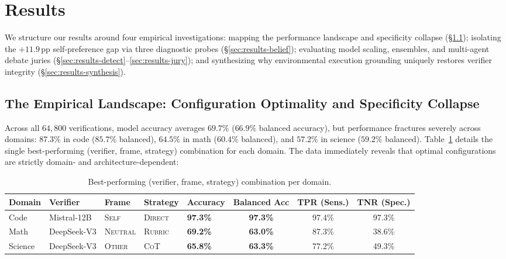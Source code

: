 \section{Results}
\label{sec:results}

We structure our results around four empirical investigations: mapping the performance landscape and specificity collapse (\S\ref{sec:results-landscape}); isolating the $+11.9$\,pp self-preference gap via three diagnostic probes (\S\ref{sec:results-belief}); evaluating model scaling, ensembles, and multi-agent debate juries (\S\ref{sec:results-detect}--\ref{sec:results-jury}); and synthesizing why environmental execution grounding uniquely restores verifier integrity (\S\ref{sec:results-synthesis}).

\subsection{The Empirical Landscape: Configuration Optimality and Specificity Collapse}
\label{sec:results-landscape}

Across all $64{,}800$ verifications, model accuracy averages $69.7\%$ ($66.9\%$ balanced accuracy), but performance fractures severely across domains: $87.3\%$ in code ($85.7\%$ balanced), $64.5\%$ in math ($60.4\%$ balanced), and $57.2\%$ in science ($59.2\%$ balanced). Table~\ref{tab:best-combo} details the single best-performing (verifier, frame, strategy) combination for each domain. The data immediately reveals that optimal configurations are strictly domain- and architecture-dependent:

\begin{table}[t]
\centering
\footnotesize
\renewcommand{\arraystretch}{0.92}
\caption{Best-performing (verifier, frame, strategy) combination per domain.}
\label{tab:best-combo}
\begin{tabular}{lllllccc}
\toprule
\bf Domain & \bf Verifier & \bf Frame & \bf Strategy & \bf Accuracy & \bf Balanced Acc & \bf TPR (Sens.) & \bf TNR (Spec.) \\
\midrule
Code    & Mistral-12B  & \textsc{Self}    & \textsc{Direct} & \bf 97.3\% & \bf 97.3\% & 97.4\% & 97.3\% \\
Math    & DeepSeek-V3  & \textsc{Neutral} & \textsc{Rubric} & \bf 69.2\% & \bf 63.0\% & 87.3\% & 38.6\% \\
Science & DeepSeek-V3  & \textsc{Other}   & \textsc{CoT}    & \bf 65.8\% & \bf 63.3\% & 77.2\% & 49.3\% \\
\bottomrule
\end{tabular}
\end{table}


